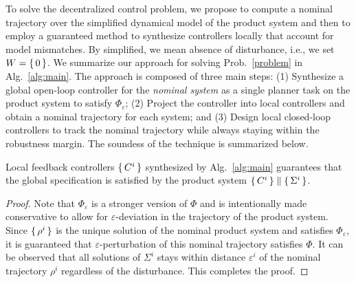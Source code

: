

To solve the decentralized control problem, 
we propose to compute a nominal trajectory over the simplified dynamical model of the product system and then to
employ a guaranteed method to synthesize controllers locally that account for model mismatches. 
By simplified, we mean absence of disturbance, i.e., we set $W=\set{0}$.
We summarize our approach for solving Prob.~\ref{problem} in Alg.~\ref{alg:main}.
The approach is composed of three main steps:
(1) Synthesize a global open-loop controller for the \emph{nominal system} as a single planner task on the product system to satisfy $\Phi_\varepsilon$;
(2) Project the controller into local controllers and obtain a nominal trajectory for each system; and
(3) Design local closed-loop controllers to track the nominal trajectory while always staying within the robustness margin.
The soundess of the technique is summarized below.

\begin{theorem}
Local feedback controllers $\set{C^i}$ synthesized by Alg.~\ref{alg:main} guarantees that the global specification is satisfied by the product system $\set{C^i}\parallel \set{\Sigma^i}$. 
\end{theorem}
\begin{proof}
Note that $\Phi_\varepsilon$ is a stronger version of $\Phi$ and is intentionally made conservative to allow for $\varepsilon$-deviation in the trajectory of the product system.
Since $\set{\rho^i}$ is the unique solution of the nominal product system and satisfies $\Phi_\varepsilon$, it is guaranteed that $\varepsilon$-perturbation of this nominal trajectory satisfies $\Phi$.
It can be observed that all solutions of $\Sigma^i$ stays within distance $\varepsilon^i$ of the nominal trajectory 
$\rho^i$ regardless of the disturbance. 
This completes the proof.
\end{proof}

